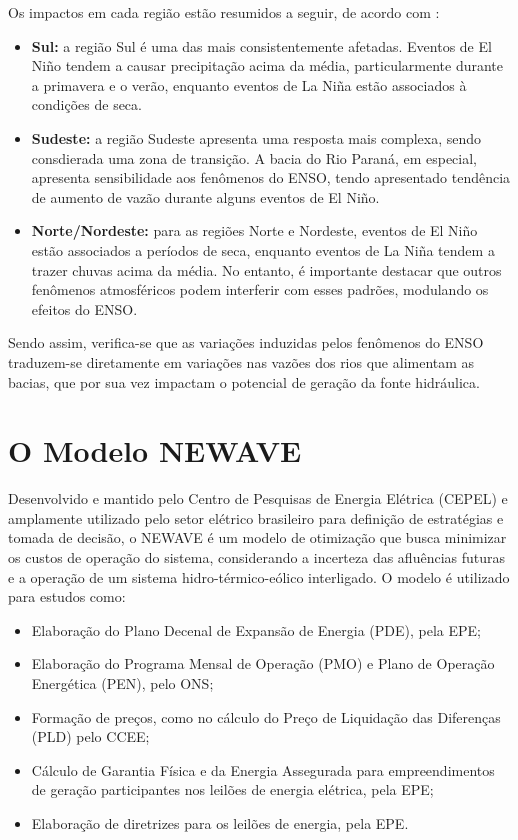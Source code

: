 Os impactos em cada região estão resumidos a seguir, de acordo com :
\begin{itemize}
	\item \textbf{Sul:} a região Sul é uma das mais consistentemente afetadas. Eventos de El Niño tendem a causar precipitação acima da média,
particularmente durante a primavera e o verão, enquanto eventos de La Niña estão associados à condições de seca.
	\item \textbf{Sudeste:} a região Sudeste apresenta uma resposta mais complexa, sendo consdierada uma zona de transição. A bacia do Rio Paraná,
em especial, apresenta sensibilidade aos fenômenos do ENSO, tendo apresentado tendência de aumento de vazão durante alguns
eventos de El Niño.
	\item \textbf{Norte/Nordeste:} para as regiões Norte e Nordeste, eventos de El Niño estão associados a períodos de seca, enquanto eventos de
La Niña tendem a trazer chuvas acima da média. No entanto, é importante destacar que outros fenômenos atmosféricos podem
interferir com esses padrões, modulando os efeitos do ENSO.
\end{itemize}

Sendo assim, verifica-se que as variações induzidas pelos fenômenos do ENSO traduzem-se diretamente em variações nas
vazões dos rios que alimentam as bacias, que por sua vez impactam o potencial de geração da fonte hidráulica.


\section{O Modelo NEWAVE}
\label{sec:newave}

Desenvolvido e mantido pelo Centro de Pesquisas de Energia Elétrica (CEPEL) e amplamente utilizado pelo setor elétrico 
brasileiro para definição de estratégias e tomada de decisão, o NEWAVE é um modelo de otimização que busca minimizar os 
custos de operação do sistema, considerando a incerteza das afluências futuras e a operação de um sistema 
hidro-térmico-eólico interligado. O modelo é utilizado para estudos como:
\begin{itemize}
	\item Elaboração do Plano Decenal de Expansão de Energia (PDE), pela EPE;
	\item Elaboração do Programa Mensal de Operação (PMO) e Plano de Operação Energética (PEN), pelo ONS;
	\item Formação de preços, como no cálculo do Preço de Liquidação das Diferenças (PLD) pelo CCEE;
	\item Cálculo de Garantia Física e da Energia Assegurada para empreendimentos de geração participantes nos leilões 
    de energia elétrica, pela EPE;
	\item Elaboração de diretrizes para os leilões de energia, pela EPE.
\end{itemize}

